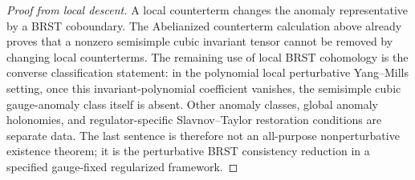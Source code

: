 \begin{proof}[Proof from local descent]
A local counterterm changes the anomaly representative by a BRST coboundary.
The Abelianized counterterm calculation above already proves that a nonzero
semisimple cubic invariant tensor cannot be removed by changing local
counterterms.  The remaining use of local BRST cohomology is the converse
classification statement: in the polynomial local perturbative Yang--Mills
setting, once this invariant-polynomial coefficient vanishes, the semisimple
cubic gauge-anomaly class itself is absent.  Other anomaly classes, global
anomaly holonomies, and regulator-specific Slavnov--Taylor restoration
conditions are separate data.  The last sentence is therefore not an
all-purpose nonperturbative existence theorem; it is the perturbative BRST
consistency reduction in a specified gauge-fixed regularized framework.
\end{proof}

